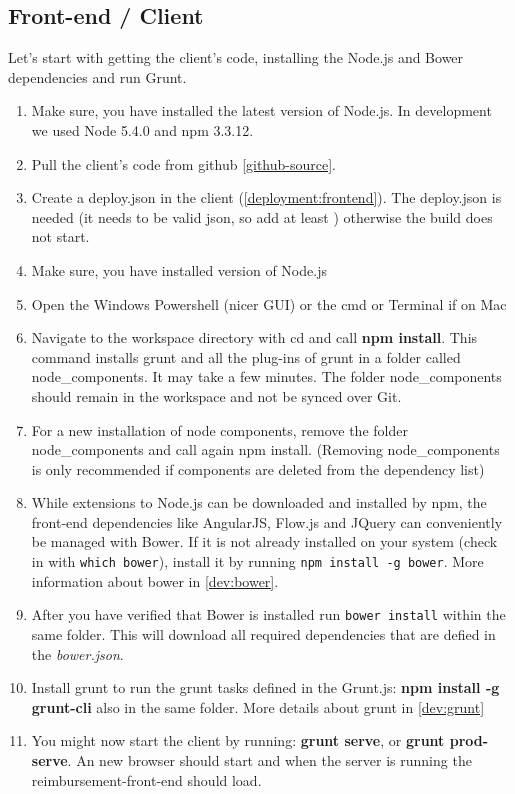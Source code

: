 \subsection{Front-end / Client}
\label{installation:client}
Let's start with getting the client's code, installing the Node.js and Bower dependencies and run Grunt.
\begin{enumerate}
	\item Make sure, you have installed the latest version of Node.js. In development we used Node 5.4.0 and npm 3.3.12.
	\item  Pull the client's code from github \ref{github-source}.
	\item  Create a deploy.json in the client (\ref{deployment:frontend}). The deploy.json is needed (it needs to be valid json, so add at least \textbf{{}}) otherwise the build does not start.
	\item Make sure, you have installed version of Node.js
	\item Open the Windows Powershell (nicer GUI) or the cmd or Terminal if on Mac
	\item Navigate to the workspace directory with cd and call \textbf{npm install}. This command installs grunt and all the plug-ins of grunt in a folder called node\_components. It may take a few minutes. The folder node\_components should remain in the workspace and not be synced over Git. 
	\item For a new installation of node components, remove the folder node\_components and call again npm install. (Removing node\_components is only recommended if components are deleted from the dependency list)
	
	\item While extensions to Node.js can be downloaded and installed by npm, the front-end dependencies like AngularJS, Flow.js and JQuery can conveniently be managed with Bower. If it is not already installed on your system (check in with \texttt{which bower}), install it by running \texttt{npm install -g bower}.  More information about bower in \ref{dev:bower}.
	\item After you have verified that Bower is installed run \texttt{bower install} within the same folder. This will download all required dependencies that are defied in the \textit{bower.json}.
	\item Install grunt to run the grunt tasks defined in the Grunt.js: \textbf{npm install -g grunt-cli} also in the same folder. More details about grunt in \ref{dev:grunt}
	\item You might now start the client by running: \textbf{grunt serve}, or \textbf{grunt prod-serve}. An new browser should start and when the server is running the reimbursement-front-end should load.
\end{enumerate}

